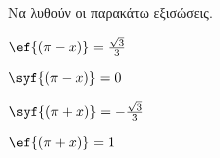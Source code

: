 Να λυθούν οι παρακάτω εξισώσεις.
\begin{multicols}{2}
\begin{alist}[leftmargin=2mm]
\item $ \ef{\left( \pi-x\right) }=\frac{\sqrt{3}}{3} $
\item $ \syf{\left(\pi-x\right) }=0 $
\item $ \syf{\left(\pi+x\right) }=-\frac{\sqrt{3}}{3} $
\item $ \ef{\left(\pi+x \right) }=1 $
\end{alist}
\end{multicols}
